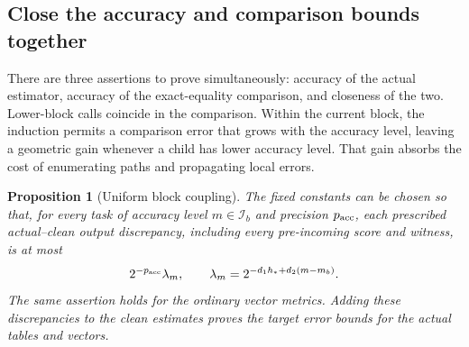 \documentclass[11pt]{article}
\numberwithin{equation}{section}
\newtheorem{proposition}[theorem]{Proposition}
\theoremstyle{definition}
\theoremstyle{remark}
\begin{document}
\subsection{Close the accuracy and comparison bounds together}

There are three assertions to prove simultaneously: accuracy of the actual estimator, accuracy of the exact-equality comparison, and closeness of the two. Lower-block calls coincide in the comparison. Within the current block, the induction permits a comparison error that grows with the accuracy level, leaving a geometric gain whenever a child has lower accuracy level. That gain absorbs the cost of enumerating paths and propagating local errors.

\begin{proposition}[Uniform block coupling]\label{prop:fp-coupling}
The fixed constants can be chosen so that, for every task of accuracy level
${m}\in\mathcal I_b$ and precision ${p_{\rm acc}}$, each prescribed actual--clean
output discrepancy, including every pre-incoming score and witness,
is at most
\begin{equation}
 2^{-{p_{\rm acc}}}\lambda_{m},\qquad
 \lambda_{m}=2^{-{d}_1h_*+{d}_2({m}-{m}_b)}.
 \label{eq:fp-lambda}
\end{equation}
The same assertion holds for the ordinary vector metrics.  Adding
these discrepancies to the clean estimates proves the target error
bounds for the actual tables and vectors.
\end{proposition}
\end{document}
